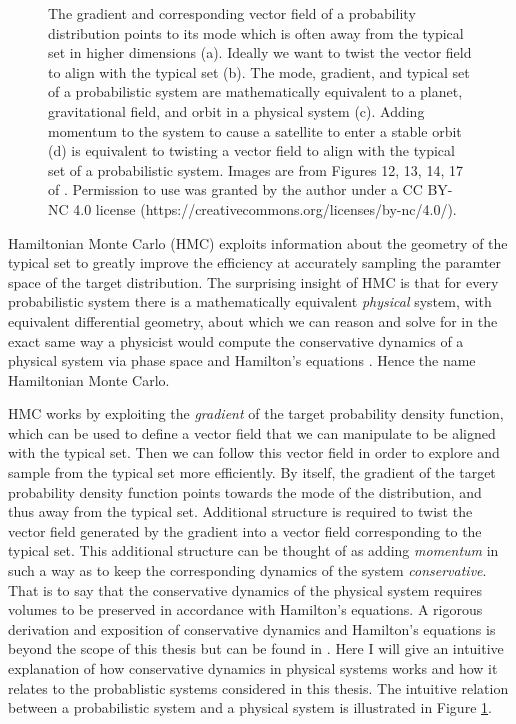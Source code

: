 \begin{figure}
	\caption{The gradient and corresponding vector field of a probability distribution points to its mode which is often away from the typical set in higher dimensions (a). Ideally we want to twist the vector field to align with the typical set (b). The mode, gradient, and typical set of a probabilistic system are mathematically equivalent to a planet, gravitational field, and orbit in a physical system (c). Adding momentum to the system to cause a satellite to enter a stable orbit (d) is equivalent to twisting a vector field to align with the typical set of a probabilistic system. Images are from Figures 12, 13, 14, 17 of \cite{Betancourt2017}. Permission to use was granted by the author under a CC BY-NC 4.0 license (https://creativecommons.org/licenses/by-nc/4.0/).}
	\label{fig:hmc}
\end{figure}

Hamiltonian Monte Carlo (HMC) exploits information about the geometry of the typical set to greatly improve the efficiency at accurately sampling the paramter space of the target distribution. The surprising insight of HMC is that for every probabilistic system there is a mathematically equivalent \textit{physical} system, with equivalent differential geometry, about which we can reason and solve for in the exact same way a physicist would compute the conservative dynamics of a physical system via phase space and Hamilton's equations \cite{Betancourt2017}. Hence the name Hamiltonian Monte Carlo.

HMC works by exploiting the \textit{gradient} of the target probability density function, which can be used to define a vector field that we can manipulate to be aligned with the typical set. Then we can follow this vector field in order to explore and sample from the typical set more efficiently. By itself, the gradient of the target probability density function points towards the mode of the distribution, and thus away from the typical set. Additional structure is required to twist the vector field generated by the gradient into a vector field corresponding to the typical set. This additional structure can be thought of as adding \textit{momentum} in such a way as to keep the corresponding dynamics of the system \textit{conservative}. That is to say that the conservative dynamics of the physical system requires volumes to be preserved in accordance with Hamilton's equations. A rigorous derivation and exposition of conservative dynamics and Hamilton's equations is beyond the scope of this thesis but can be found in \cite{Betancourt2017}. Here I will give an intuitive explanation of how conservative dynamics in physical systems works and how it relates to the probablistic systems considered in this thesis. The intuitive relation between a probabilistic system and a physical system is illustrated in Figure \ref{fig:hmc}.

